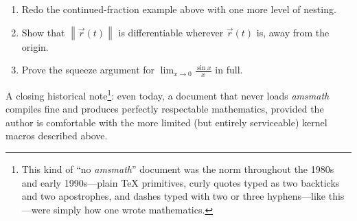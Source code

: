 \documentclass[12pt]{article}
\begin{document}
\begin{enumerate}
  \item Redo the continued-fraction example above with one more level of nesting.
  \item Show that $\left\| \vec{r}(t) \right\|$ is differentiable wherever $\vec{r}(t)$ is,
    away from the origin.
  \item Prove the squeeze argument for $\lim_{x \to 0} \frac{\sin x}{x}$ in full.
\end{enumerate}

A closing historical note\footnote{This kind of ``no \emph{amsmath}'' document was the
norm throughout the 1980s and early 1990s---plain \TeX{} primitives, curly quotes typed as
two backticks and two apostrophes, and dashes typed with two or three hyphens---like
this---were simply how one wrote mathematics.}: even today, a document that never loads
\emph{amsmath} compiles fine and produces perfectly respectable mathematics, provided the
author is comfortable with the more limited (but entirely serviceable) kernel macros
described above.
\end{document}

